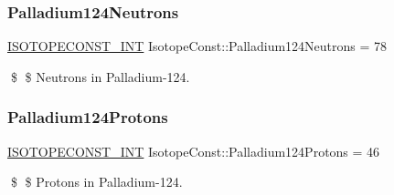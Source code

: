 \subsubsection{\texorpdfstring{Palladium124\+Neutrons}{Palladium124Neutrons}}
{\footnotesize\ttfamily \mbox{\hyperlink{group___isotope_const-_macros_ga5f18360b3e99483a35c32d789e62621c}{I\+S\+O\+T\+O\+P\+E\+C\+O\+N\+S\+T\+\_\+\+I\+NT}} Isotope\+Const\+::\+Palladium124\+Neutrons = 78}

\$ \$ Neutrons in Palladium-\/124. \mbox{\label{group___isotope_const-_palladium-_pd124_ga57a2ce0d043b70cee895ea0156d7587c}} 
\subsubsection{\texorpdfstring{Palladium124\+Protons}{Palladium124Protons}}
{\footnotesize\ttfamily \mbox{\hyperlink{group___isotope_const-_macros_ga5f18360b3e99483a35c32d789e62621c}{I\+S\+O\+T\+O\+P\+E\+C\+O\+N\+S\+T\+\_\+\+I\+NT}} Isotope\+Const\+::\+Palladium124\+Protons = 46}

\$ \$ Protons in Palladium-\/124. 
